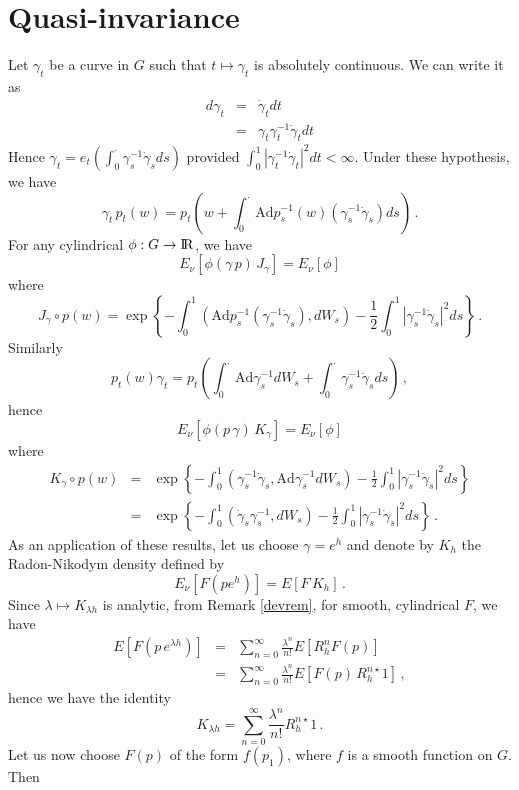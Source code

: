\documentclass[12pt,a4paper]{book}
\newcommand{\R}{{\rm I\!R}}
\begin{document}
\section{Quasi-invariance}
Let $\gamma_t$ be a curve in $G$ such that $t\mapsto \gamma_t$ is absolutely
continuous. We can write it as
\begin{eqnarray*}
d\gamma_t&=&{\dot{\gamma}}_t dt\\
        &=&\gamma_t \gamma^{-1}_t{\dot{\gamma}}_t dt
\end{eqnarray*}
Hence $\gamma_t=e_t(\int_0^\cdot \gamma^{-1}_s{\dot{\gamma}}_s ds)$ provided
$\int_0^1|\gamma^{-1}_t{\dot{\gamma}}_t|^2 dt<\infty$. Under these hypothesis,
we have
$$
\gamma_t\,p_t(w)=p_t\left(w+\int_0^\cdot
{\mbox{Ad}}p_s^{-1}(w)(\gamma_s^{-1}{\dot{\gamma}}_s)ds\right)\,.
$$
For any cylindrical $\phi: G\rightarrow \R$, we have
$$
E_\nu\left[\phi(\gamma\,p) \,J_\gamma\right]=E_\nu[\phi]
$$
where
$$
J_\gamma\circ p(w)=\exp\left\{-\int_0^1
({\mbox{Ad}}p_s^{-1}(\gamma_s^{-1}{\dot{\gamma}}_s),dW_s)-\frac{1}{2}\int_0^1
|\gamma^{-1}_s{\dot{\gamma}}_s|^2 ds\right\}\,.
$$
Similarly
$$
p_t(w)\gamma_t=p_t\left(\int_0^\cdot{\mbox{Ad}}\gamma_s^{-1}dW_s+\int_0^\cdot
\gamma_s^{-1}{\dot{\gamma}}_s ds\right)\,,
$$
hence
$$
E_\nu\left[\phi(p\,\gamma)\,K_\gamma \right]=E_\nu[\phi]
$$
where
\begin{eqnarray}
K_\gamma\circ
p(w)&=&\exp\left
\{-\int_0^1(\gamma^{-1}_s{\dot{\gamma}}_s,{\mbox{Ad}}\gamma^{-1}_s
  dW_s)-\frac{1}{2}\int_0^1|\gamma_s^{-1}{\dot{\gamma}}_s|^2ds\right\}\nonumber\\
&=&\exp\left\{-\int_0^1({\dot{\gamma}}_s\gamma^{-1}_s,dW_s)-\frac{1}{2}\int_0^1|
\gamma_s^{-1}{\dot{\gamma}}_s|^2ds\right\}\,.
\end{eqnarray}
As an application of these results, let us choose $\gamma=e^h$ and denote by
$K_h$ the Radon-Nikodym density defined by
$$
E_\nu[F(pe^{ h})]=E[F\,K_{ h}]\,.
$$
Since $\lambda \mapsto K_{\lambda h}$ is analytic, from Remark
\ref{devrem}, for smooth, cylindrical $F$, we have
\begin{eqnarray*}
E[F(p\,e^{\lambda h})]&=&\sum_{n=0}^\infty\frac{\lambda^n}{n!}E[R_h^nF(p)]\\
              &=&\sum_{n=0}^\infty\frac{\lambda^n}{n!}E[F(p)\,R_h^{n\star}1]\,,
\end{eqnarray*}
hence we have the identity
$$
K_{\lambda h}=\sum_{n=0}^\infty \frac{\lambda^n}{n!}R_h^{n\star}1\,.
$$
Let us now choose $F(p)$ of the form $f(p_1)$, where $f$ is a smooth
function on $G$. Then
\end{document}
